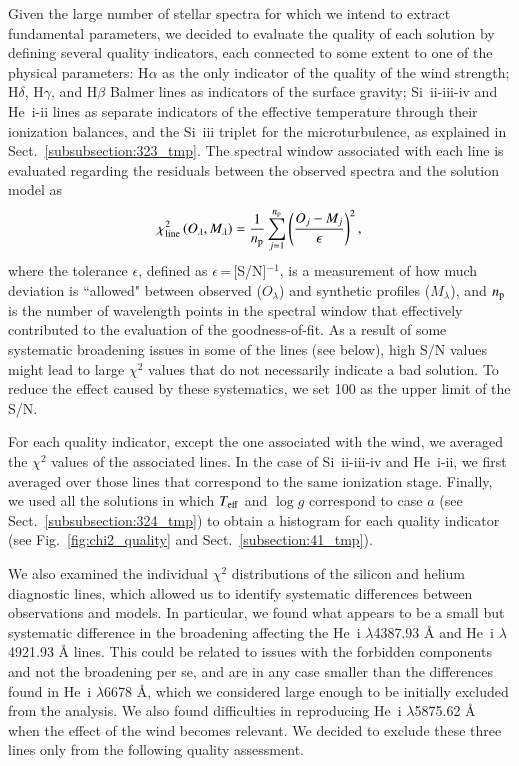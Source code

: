 \documentclass{aa}
\newcommand{\Teff}{\mbox{$T_{\rm eff}$}\xspace}
\newcommand{\logg}{\mbox{$\log g$}\xspace}
\let\oldAA\AA
\renewcommand*{\AA}{\,\oldAA\xspace}
\begin{document}
Given the large number of stellar spectra for which we intend to extract fundamental parameters, we decided to evaluate the quality of each solution by defining several quality indicators, each connected to some extent to one of the physical parameters: H$\alpha$ as the only indicator of the quality of the wind strength; H$\delta$, H$\gamma$, and H$\beta$ Balmer lines as indicators of the surface gravity; Si~{\sc ii-iii-iv} and He~{\sc i-ii} lines as separate indicators of the effective temperature through their ionization balances, and the Si~{\sc iii} triplet for the microturbulence, as explained in Sect.~\ref{subsubsection:323_tmp}.
The spectral window associated with each line is evaluated regarding the residuals between the observed spectra and the solution model as 
%
\begin{equation}
\chi_{\rm line}^2\left(O_\lambda, M_\lambda\right)=\frac{1}{n_{\rm p}} \sum_{j=1}^{n_{\rm p}}\left(\frac{O_j-M_j}{\epsilon}\right)^2,
\label{eq:chi2}
\end{equation}
%
where the tolerance $\epsilon$, defined as $\epsilon$\,=\,[S/N]$^{-1}$, is a measurement of how much deviation is ``allowed" between observed ($O_\lambda$) and synthetic profiles ($M_\lambda$), and $n_{\rm p}$ is the number of wavelength points in the spectral window that effectively contributed to the evaluation of the goodness-of-fit. As a result of some systematic broadening issues in some of the lines (see below), high S/N values might lead to large $\chi^{2}$ values that do not necessarily indicate a bad solution. To reduce the effect caused by these systematics, we set 100 as the upper limit of the S/N.

For each quality indicator, except the one associated with the wind, we averaged the $\chi^{2}$ values of the associated lines. In the case of Si~{\sc ii-iii-iv} and He~{\sc i-ii}, we first averaged over those lines that correspond to the same ionization stage. Finally, we used all the solutions in which \Teff and \logg correspond to case $a$ (see Sect.~\ref{subsubsection:324_tmp}) to obtain a histogram for each quality indicator (see Fig.~\ref{fig:chi2_quality} and Sect.~\ref{subsection:41_tmp}). 

We also examined the individual $\chi^{2}$ distributions of the silicon and helium diagnostic lines, which allowed us to identify systematic differences between observations and models. In particular, we found what appears to be a small but systematic difference in the broadening affecting the He~{\sc i} $\lambda$4387.93\,{\AA} and He~{\sc i} $\lambda$4921.93\,{\AA} lines. This could be related to issues with the forbidden components and not the broadening per se, and are in any case smaller than the differences found in He~{\sc i} $\lambda$6678\,{\AA}, which we considered large enough to be initially excluded from the analysis. 
We also found difficulties in reproducing He~{\sc i} $\lambda$5875.62\,{\AA} when the effect of the wind becomes relevant. 
We decided to exclude these three lines only from the following quality assessment. 
\end{document}

